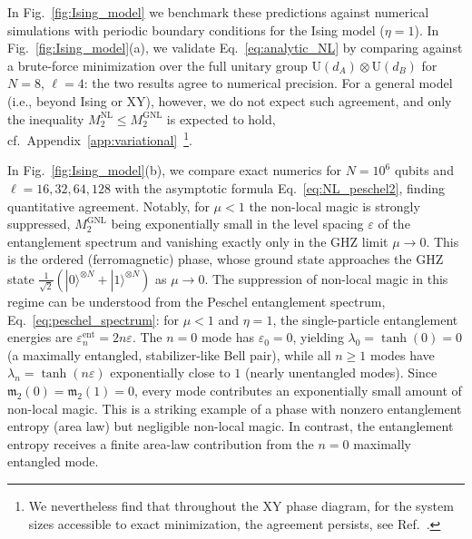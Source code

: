 \documentclass[prx,twocolumn,superscriptaddress,aps,10pt, frontmatterverbose, reprint,footinbib,longbibliography=true]{revtex4-2}
\begin{document}
In Fig.~\ref{fig:Ising_model} we benchmark these predictions against numerical simulations with periodic boundary conditions for the Ising model ($\eta=1$).
In Fig.~\ref{fig:Ising_model}(a), we validate Eq.~\eqref{eq:analytic_NL} by comparing against a brute-force minimization over the full unitary group $\mathrm{U}(d_A)\otimes\mathrm{U}(d_B)$ for $N=8$, $\ell=4$: the two results agree to numerical precision. For a general model (i.e., beyond Ising or XY), however, we do not expect such agreement, and only the inequality
$M_2^{\mathrm{NL}}\le M_2^{\mathrm{GNL}}$ is expected to hold,
cf.~Appendix~\ref{app:variational}~\footnote{We nevertheless find that throughout the XY phase
diagram, for the system sizes accessible to exact minimization, the agreement persists, see Ref.~\cite{zenodo}.}.

In Fig.~\ref{fig:Ising_model}(b), we compare exact numerics for $N=10^6$ qubits and $\ell = 16,32,64,128$ with the asymptotic formula Eq.~\eqref{eq:NL_peschel2}, finding quantitative agreement. Notably, for $\mu<1$ the non-local magic is strongly suppressed, $M_2^{\mathrm{GNL}}$ being exponentially small in the level spacing $\varepsilon$ of the entanglement spectrum and vanishing exactly only in the GHZ limit $\mu\to0$. This is the ordered (ferromagnetic) phase, whose ground state approaches the GHZ state $\frac{1}{\sqrt{2}}(|0\rangle^{\otimes N}+|1\rangle^{\otimes N})$ as $\mu\to 0$. The suppression of non-local magic in this regime can be understood from the Peschel entanglement spectrum, Eq.~\eqref{eq:peschel_spectrum}: for $\mu<1$ and $\eta=1$, the single-particle entanglement energies are $\varepsilon_n^{\mathrm{ent}}=2n\varepsilon$. The $n=0$ mode has $\varepsilon_0=0$, yielding $\lambda_0=\tanh(0)=0$ (a maximally entangled, stabilizer-like Bell pair), while all $n\ge 1$ modes have $\lambda_n=\tanh(n\varepsilon)$ exponentially close to $1$ (nearly unentangled modes). Since $\mathfrak{m}_2(0)=\mathfrak{m}_2(1)=0$, every mode contributes an exponentially small amount of non-local magic. This is a striking example of a phase with nonzero entanglement entropy (area law) but negligible  non-local magic. In contrast, the entanglement entropy receives a finite area-law contribution from the $n=0$ maximally entangled mode.
\end{document}
